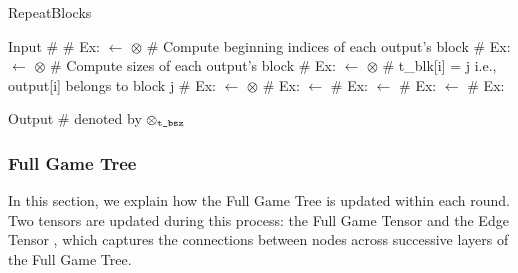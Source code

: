 \begin{algorithm}
\caption{RepeatBlocks }
\label{alg:RepeatBlocks}
\begin{algorithmic}[1]
\State Input 
\Statex \textcolor{green!50!black}{\scriptsize \# }
\Statex \textcolor{green!50!black}{\scriptsize \# Ex: }
\State {} $\gets$ $\otimes$
\Statex \textcolor{green!50!black}{\scriptsize \# Compute beginning indices of each output's block}
\Statex \textcolor{green!50!black}{\scriptsize \# Ex: }
\State {} $\gets$ $\otimes$
\Statex \textcolor{green!50!black}{\scriptsize \# Compute sizes of each output's block}
\Statex \textcolor{green!50!black}{\scriptsize \# Ex: }
\State {} $\gets$ $\otimes$
\Statex \textcolor{green!50!black}{\scriptsize \# t\_blk[i] = j i.e., output[i] belongs to block j}
\Statex \textcolor{green!50!black}{\scriptsize \# Ex: }
\State {} $\gets$ $\otimes$
\Statex \textcolor{green!50!black}{\scriptsize \# Ex: }
\State {} $\gets$ 
\Statex \textcolor{green!50!black}{\scriptsize \# Ex: }
\State {} $\gets$ 
\Statex \textcolor{green!50!black}{\scriptsize \# Ex: }
\State {} $\gets$ 
\Statex \textcolor{green!50!black}{\scriptsize \# Ex: }

\State Output  
\Statex \textcolor{green!50!black}{\scriptsize \# denoted by $\otimes_{\texttt{t\_bsz}}$}
\end{algorithmic}
\end{algorithm}
\subsubsection{Full Game Tree}
In this section, we explain how the Full Game Tree is updated within each round. Two tensors are updated during this process: the Full Game Tensor  and the Edge Tensor , which captures the connections between nodes across successive layers of the Full Game Tree.

